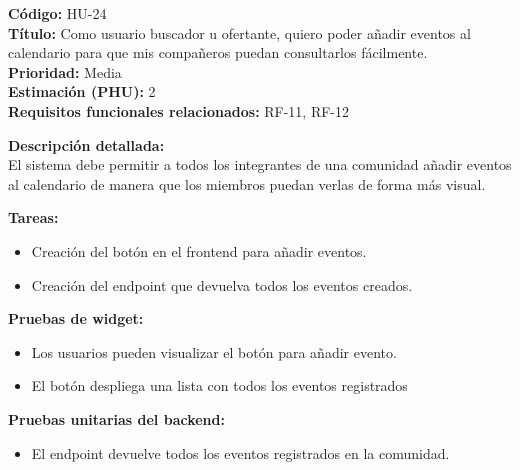 \begin{tarjetaHU}
\textbf{Código:} HU-24 \\
\textbf{Título:} Como usuario buscador u ofertante, quiero poder añadir eventos al calendario para que mis compañeros puedan consultarlos fácilmente. \\
\textbf{Prioridad:} Media \\
\textbf{Estimación (PHU):} 2 \\
\textbf{Requisitos funcionales relacionados:} RF-11, RF-12

\vspace{0.5em}
\textbf{Descripción detallada:} \\
El sistema debe permitir a todos los integrantes de una comunidad añadir eventos al calendario de manera que los miembros puedan verlas de forma más visual.

\vspace{0.5em}
\textbf{Tareas:}
\begin{itemize}[left=0pt]
  \item Creación del botón en el frontend para añadir eventos.
  \item Creación del endpoint que devuelva todos los eventos creados. 
\end{itemize}

\vspace{0.5em}
\textbf{Pruebas de widget:}
\begin{itemize}[left=0pt]
  \item Los usuarios pueden visualizar el botón para añadir evento.
  \item El botón despliega una lista con todos los eventos registrados
\end{itemize}
\textbf{Pruebas unitarias del backend:}
\begin{itemize}[left=0pt]
  \item El endpoint devuelve todos los eventos registrados en la comunidad.
\end{itemize}
\end{tarjetaHU}

